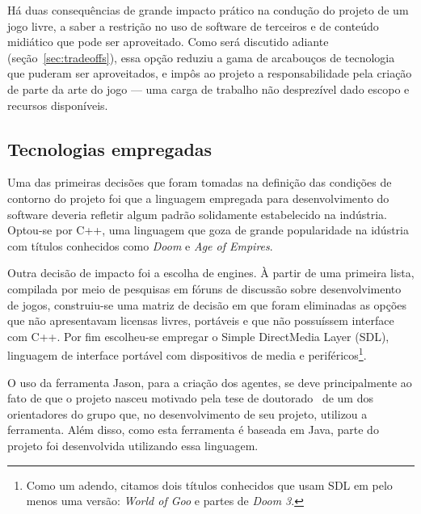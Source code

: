 Há duas consequências de grande impacto prático na condução do projeto de um jogo livre,  a saber a restrição no uso de software de terceiros e de conteúdo midiático que pode ser aproveitado. Como será discutido adiante (seção~\ref{sec:tradeoffs}), essa opção reduziu a gama de arcabouços de tecnologia que puderam ser aproveitados, e impôs ao projeto a responsabilidade pela criação de parte da arte do jogo --- uma carga de trabalho não desprezível dado escopo e recursos disponíveis.  

\subsection{Tecnologias empregadas}\label{tecnologias_empregadas}

Uma das primeiras decisões que foram tomadas na definição das condições de contorno do projeto foi que a linguagem empregada para desenvolvimento do software deveria refletir algum padrão solidamente estabelecido na indústria. Optou-se por C++, uma linguagem que goza de grande popularidade na idústria com títulos conhecidos como \emph{Doom} e \emph{Age of Empires}.

Outra decisão de impacto foi a escolha de engines. À partir de uma primeira lista, compilada por meio de pesquisas em fóruns de discussão sobre desenvolvimento de jogos, construiu-se uma matriz de decisão em que foram eliminadas as opções que não apresentavam licensas livres, portáveis e que não possuíssem interface com C++. Por fim escolheu-se empregar o Simple DirectMedia Layer (SDL), linguagem de interface portável com dispositivos de media e periféricos\footnote{Como um adendo, citamos dois títulos conhecidos que usam SDL em pelo menos uma versão: \emph{World of Goo} e partes de \emph{Doom 3}.}.

O uso da ferramenta Jason, para a criação dos agentes, se deve principalmente ao fato de que o projeto nasceu motivado pela tese de doutorado~\cite{tese_roberto} de um dos orientadores do grupo que, no desenvolvimento de seu projeto, utilizou a ferramenta. Além disso, como esta ferramenta é baseada em Java, parte do projeto foi desenvolvida utilizando essa linguagem.



